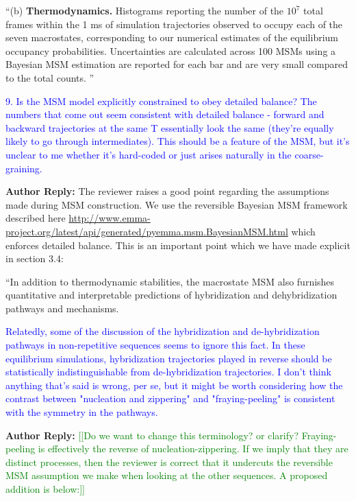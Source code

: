 \documentclass[11pt,a4paper]{letter} %
\newcommand*{\rood}[1]{{\color{red}{#1}}}
\newcommand*{\noteg}[1]{\textcolor{green}{[[#1]]}}		%
\begin{document}
``(b) \textbf{Thermodynamics.} Histograms reporting the number of the $10^7$ total frames within the 1 ms of simulation trajectories observed to occupy each of the seven macrostates, corresponding to our numerical estimates of the equilibrium occupancy probabilities. Uncertainties are calculated across 100 MSMs using a Bayesian MSM estimation are reported for each bar and are very small compared to the total counts. \rood{Values are reported on a log y-axis to properly visualize less low-population states}''

\textcolor{blue}{9. Is the MSM model explicitly constrained to obey detailed balance? The numbers that come out seem consistent with detailed balance - forward and backward trajectories at the same T essentially look the same (they're equally likely to go through intermediates). This should be a feature of the MSM, but it's unclear to me whether it's hard-coded or just arises naturally in the coarse-graining.}

\textbf{Author Reply:}    The reviewer raises a good point regarding the assumptions made during MSM construction. We use the reversible Bayesian MSM framework described here \url{http://www.emma-project.org/latest/api/generated/pyemma.msm.BayesianMSM.html} which enforces detailed balance. This is an important point which we have made explicit in section 3.4:

``In addition to thermodynamic stabilities, the macrostate MSM also furnishes quantitative and interpretable predictions of hybridization and dehybridization pathways and mechanisms. \rood{It should be noted that because we are using a reversible MSM framework, detailed balance is enforced by construction.''}

\textcolor{blue}{Relatedly, some of the discussion of the hybridization and de-hybridization pathways in non-repetitive sequences seems to ignore this fact. In these equilibrium simulations, hybridization trajectories played in reverse should be statistically indistinguishable from de-hybridization trajectories. I don't think anything that's said is wrong, per se, but it might be worth considering how the contrast between "nucleation and zippering" and "fraying-peeling" is consistent with the symmetry in the pathways.}

\textbf{Author Reply:}   \noteg{Do we want to change this terminology? or clarify? Fraying-peeling is effectively the reverse of nucleation-zippering. If we imply that they are distinct processes, then the reviewer is correct that it undercuts the reversible MSM assumption we make when looking at the other sequences. A proposed addition is below:}
\end{document}
